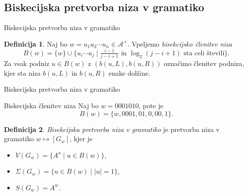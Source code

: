 \documentclass{beamer}
\newcommand{\A}{\mathcal{A}}
\theoremstyle{definition} %
\newtheorem{definicija}{Definicija}[section]
\begin{document}
\subsection{Biskecijska pretvorba niza v gramatiko}

\begin{frame}{Biskecijska pretvorba niza v gramatiko}
    \begin{definicija}
        Naj bo $ w = u_1 u_2 \cdots u_n \in \A^+ $.
        Vpeljemo \textit{bisekcijsko členitev niza}
        \[
            B(w) = \{ w \} \cup \{ u_i \cdots u_j \mid \tfrac{i-1}{j-i+1} \text{ in } \log_2{(j-i+1)} \text{ sta celi števili}  \}.
        \]
        \pause
        Za vsak podniz $ u \in B(w) $ z $ ( b(u, L), b(u,R) )$ označimo členitev podniza, kjer sta niza $ b(u, L) $ in $ b(u,R) $ enake dolžine.
    \end{definicija}
\end{frame}

\begin{frame}{Biskecijska pretvorba niza v gramatiko}
    \begin{exampleblock}{Biskecijska členitev niza}
        Naj bo $w = 0001010 $, pote je
        \[
            B(w) = \{ w, 0001, 01, 0, 00, 1 \}.
        \]
    \end{exampleblock}
\end{frame}

\begin{frame}{}
    \begin{definicija}
        \textit{Bisekcijska pretvorba niza v gramatiko} je pretvorba niza v gramatiko $ w \mapsto [G_{w}] $, kjer je
        \begin{itemize}
            \item<2-> $ V(G_{w}) = \{ A^u \mid u \in B(w) \} $,
            \item<3-> $ \Sigma(G_{w}) = \{ u \in B(w) \mid |u| = 1 \} $,
            \item<4-> $ S(G_{w}) = A^{w} $.
        \end{itemize}
    \end{definicija}
\end{frame}
\end{document}
